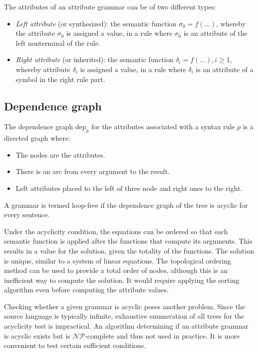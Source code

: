 The attributes of an attribute grammar can be of two different types: 
\begin{itemize}
    \item \textit{Left attribute} (or synthesized): the semantic function $\sigma_0=f(\dots)$, whereby the attribute $\sigma_0$ is assigned a value, in a rule where $\sigma_0$ is an attribute of the left nonterminal of the rule. 
    \item \textit{Right attribute} (or inherited):  the semantic function $\delta_i=f(\dots), i \geq 1$, whereby attribute $\delta_i$ is assigned a value, in a rule where $\delta_i$ is an attribute of a symbol in the right rule part. 
\end{itemize}

\subsection{Dependence graph}
The dependence graph $\text{dep}_p$ for the attributes associated with a syntax rule $p$ is a directed graph where: 
\begin{itemize}
    \item The nodes are the attributes. 
    \item There is an arc from every argument to the result. 
    \item Left attributes placed to the left of three node and right ones to the right. 
\end{itemize}

A grammar is termed loop-free if the dependence graph of the tree is acyclic for every sentence.

Under the acyclicity condition, the equations can be ordered so that each semantic function is applied after the functions that compute its arguments. 
This results in a value for the solution, given the totality of the functions. 
The solution is unique, similar to a system of linear equations. 
The topological ordering method can be used to provide a total order of nodes, although this is an inefficient way to compute the solution. 
It would require applying the sorting algorithm even before computing the attribute values.

Checking whether a given grammar is acyclic poses another problem. 
Since the source language is typically infinite, exhaustive enumeration of all trees for the acyclicity test is impractical. 
An algorithm determining if an attribute grammar is acyclic exists but is $\mathcal{NP}$-complete and thus not used in practice. 
It is more convenient to test certain sufficient conditions.

